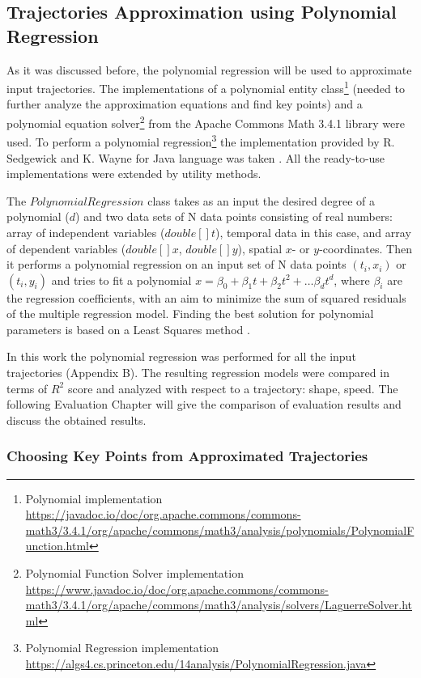 \subsection{Trajectories Approximation using Polynomial Regression}

As it was discussed before, the polynomial regression will be used to approximate input trajectories. The implementations of a polynomial entity class\footnote{Polynomial implementation \url{https://javadoc.io/doc/org.apache.commons/commons-math3/3.4.1/org/apache/commons/math3/analysis/polynomials/PolynomialFunction.html}} (needed to further analyze the approximation equations and find key points) and a polynomial equation solver\footnote{Polynomial Function Solver implementation \url{https://www.javadoc.io/doc/org.apache.commons/commons-math3/3.4.1/org/apache/commons/math3/analysis/solvers/LaguerreSolver.html}} from the Apache Commons Math 3.4.1 library were used. To perform a polynomial regression\footnote{Polynomial Regression implementation \url{https://algs4.cs.princeton.edu/14analysis/PolynomialRegression.java}} the implementation provided by R. Sedgewick and K. Wayne for Java language was taken \cite{online:polynomial_impl}. All the ready-to-use implementations were extended by utility methods.

The $PolynomialRegression$ class takes as an input the desired degree of a polynomial ($d$) and two data sets of N data points consisting of real numbers: array of independent variables ($double[] t$), temporal data in this case, and array of dependent variables ($double[] x$, $double[] y$), spatial $x$- or $y$-coordinates. Then it performs a polynomial regression on an input set of N data points $(t_i, x_i)$ or $(t_i, y_i)$ and tries to fit a polynomial $x = \beta_0 + \beta_1t + \beta_2t^2 + \ldots \beta_dt^d$, where $\beta_i$ are the regression coefficients, with an aim to minimize the sum of squared residuals of the multiple regression model. Finding the best solution for polynomial parameters is based on a Least Squares method \cite{article:behav_form_extr}.

In this work the polynomial regression was performed for all the input trajectories (Appendix B). The resulting regression models were compared in terms of $R^2$ score and analyzed with respect to a trajectory: shape, speed. The following Evaluation Chapter will give the comparison of evaluation results and discuss the obtained results.

\subsubsection{Choosing Key Points from Approximated Trajectories}

